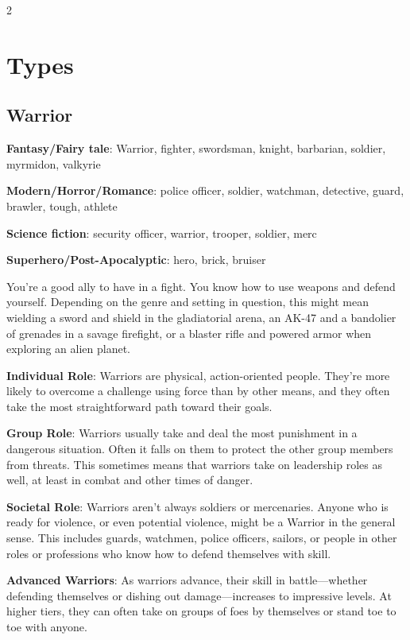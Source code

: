 
\begin{multicols}{2}

\chapter{Types}

\section{Warrior}

\textbf{Fantasy/Fairy tale}: Warrior, fighter, swordsman, knight, barbarian, soldier, myrmidon, valkyrie

\textbf{Modern/Horror/Romance}: police officer, soldier, watchman, detective, guard, brawler, tough, athlete

\textbf{Science fiction}: security officer, warrior, trooper, soldier, merc

\textbf{Superhero/Post-Apocalyptic}: hero, brick, bruiser

You’re a good ally to have in a fight. You know how to use weapons and defend yourself. Depending on the genre and setting in question, this might mean wielding a sword and shield in the gladiatorial arena, an AK-47 and a bandolier of grenades in a savage firefight, or a blaster rifle and powered armor when exploring an alien planet.

\textbf{Individual Role}: Warriors are physical, action-oriented people. They’re more likely to overcome a challenge using force than by other means, and they often take the most straightforward path toward their goals. 

\textbf{Group Role}: Warriors usually take and deal the most punishment in a dangerous situation. Often it falls on them to protect the other group members from threats. This sometimes means that warriors take on leadership roles as well, at least in combat and other times of danger.

\textbf{Societal Role}: Warriors aren’t always soldiers or mercenaries. Anyone who is ready for violence, or even potential violence, might be a Warrior in the general sense. This includes guards, watchmen, police officers, sailors, or people in other roles or professions who know how to defend themselves with skill. 

\textbf{Advanced Warriors}: As warriors advance, their skill in battle—whether defending themselves or dishing out damage—increases to impressive levels. At higher tiers, they can often take on groups of foes by themselves or stand toe to toe with anyone.


\end{multicols}
